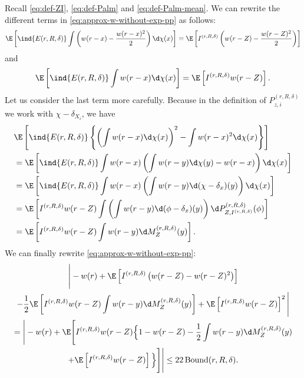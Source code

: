 \documentclass[10pt,a4paper]{article}
\begin{document}
Recall \eqref{eq:def-ZI}, \eqref{eq:def-Palm} and \eqref{eq:def-Palm-mean}. 
We can rewrite the different terms in \eqref{eq:approx-w-without-exp-pp} as follows:
\begin{align*}
\E\left[ \ind{E(r,R,\delta)} \int \left( w(r-x) - \frac{w(r-x)^2}{2} \right) \d\chi(x) \right] = \E\left[ I^{(r,R,\delta)} \left( w(r-Z) - \frac{w(r-Z)^2}{2} \right) \right] 
\end{align*}
and
\begin{align*}
\E\left[ \ind{E(r,R,\delta)} \int w(r-x) \d\chi(x) \right] = \E\left[ I^{(r,R,\delta)} w(r-Z) \right] .
\end{align*}
Let us consider the last term more carefully. Because in the definition of $P^{(r,R,\delta)}_{z,i}$ we work with $\chi - \delta_{X_i}$, we have 
\begin{align*}
&\E\left[\ind{E(r,R,\delta)} \left\{ \left(\int w(r-x) \d\chi(x) \right)^2 - \int w(r-x)^2 \d\chi(x) \right\} \right] \\
&= \E\left[\ind{E(r,R,\delta)} \int w(r-x) \left( \int w(r-y) \d\chi(y) - w(r-x) \right) \d\chi(x) \right] \\ 
&= \E\left[\ind{E(r,R,\delta)} \int w(r-x) \left( \int w(r-y) \d(\chi-\delta_x)(y) \right) \d\chi(x) \right] \\ 
&= \E\left[ I^{(r,R,\delta)} w(r-Z) \int \left(\int w(r-y) \d(\phi-\delta_x)(y) \right) \d P^{(r,R,\delta)}_{Z,I^{(r,R,\delta)}} (\phi) \right] \\ 
&= \E\left[ I^{(r,R,\delta)} w(r-Z) \int w(r-y) \d M^{(r,R,\delta)}_{Z} (y) \right] .
\end{align*}
We can finally rewrite \eqref{eq:approx-w-without-exp-pp}:
\begin{multline}\label{eq:approx-w-without-exp-rw}
\Bigg| - w(r) + \E\left[ I^{(r,R,\delta)} \left( w(r-Z) - w(r-Z)^2 \right) \right] \\
- \frac{1}{2} \E\left[ I^{(r,R,\delta)} w(r-Z) \int w(r-y) \d M^{(r,R,\delta)}_{Z} (y) \right] + \E\left[ I^{(r,R,\delta)} w(r-Z) \right]^2 \Bigg| \\
= \Bigg| - w(r) + \E\Bigg[ I^{(r,R,\delta)} w(r-Z) \Big\{ 1 - w(r-Z) - \frac{1}{2} \int w(r-y) \d M^{(r,R,\delta)}_{Z} (y) \\ 
+ \E\left[ I^{(r,R,\delta)} w(r-Z) \right] \Big\} \Bigg] \Bigg| 
\leq 22 \, \mathrm{Bound}(r,R,\delta) .
\end{multline}
\end{document}
